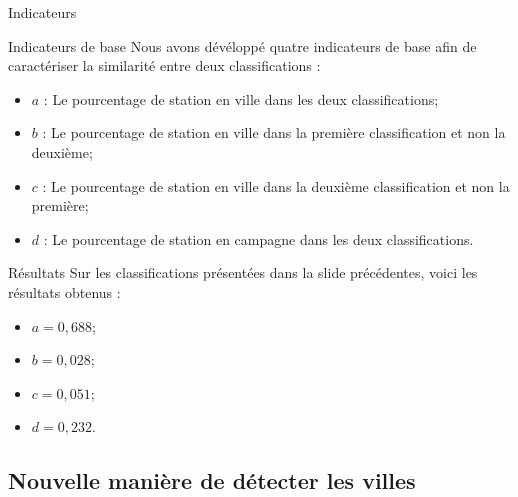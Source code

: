 \begin{frame}{Indicateurs}
    \begin{block}{Indicateurs de base}
        Nous avons dévéloppé quatre indicateurs de base afin de caractériser la similarité entre deux classifications :
        \begin{itemize}
            \item $a$ : Le pourcentage de station en ville dans les deux classifications;
            \item $b$ : Le pourcentage de station en ville dans la première classification et non la deuxième;
            \item $c$ : Le pourcentage de station en ville dans la deuxième classification et non la première;
            \item $d$ : Le pourcentage de station en campagne dans les deux classifications.
        \end{itemize}
    \end{block}
    \begin{block}{Résultats}
        Sur les classifications présentées dans la slide précédentes, voici les résultats obtenus : 
        \begin{itemize}
            \item $a = 0,688$;
            \item $b = 0,028$;
            \item $c = 0,051$;
            \item $d = 0,232$.
        \end{itemize}
    \end{block}
\end{frame}


\subsection{Nouvelle manière de détecter les villes}
\insertsubsectionframe

